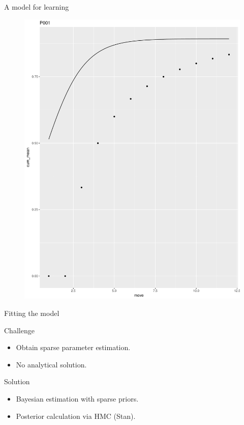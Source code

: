 \documentclass[10pt]{beamer}
\begin{document}
\begin{frame}{A model for learning}
 \begin{figure}
  \centering
  \includegraphics[scale=0.25]{exemplo-modelo}
 \end{figure}
\end{frame}

\begin{frame}{Fitting the model}
 \begin{alertblock}{Challenge}
  \begin{itemize}
   \item Obtain sparse parameter estimation.
	 \item No analytical solution.
	\end{itemize}
 \end{alertblock}
 \begin{exampleblock}{Solution}
  \begin{itemize}
   \item Bayesian estimation with sparse priors.
	 \item Posterior calculation via HMC (Stan).
	\end{itemize}
 \end{exampleblock}
\end{frame}
\end{document}

